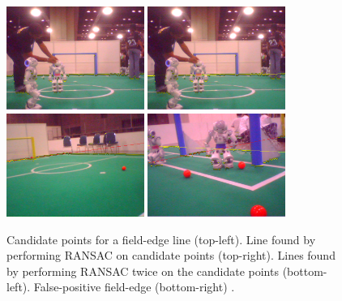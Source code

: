 \documentclass[runningheads,a4paper]{llncs}
\begin{document}
\begin{figure}
\centering
\includegraphics[width=0.4\textwidth]{figures/EdgeDetection_OneLinePoints}
\includegraphics[width=0.4\textwidth]{figures/EdgeDetection_OneLinePointsAndLine}
\includegraphics[width=0.4\textwidth]{figures/EdgeDetection_TwoLines}
\includegraphics[width=0.4\textwidth]{figures/EdgeDetection_PostTriangleError}
\caption{Candidate points for a field-edge line (top-left). Line found by
performing RANSAC on candidate points (top-right). Lines found by performing
RANSAC twice on the candidate points (bottom-left). False-positive field-edge
(bottom-right) .} \label{figEdge}
\end{figure}
\end{document}
